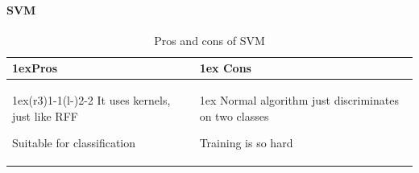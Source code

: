 \documentclass{article}
\begin{document}
        \paragraph{SVM}
        \begin{table}
        \begin{tabularx}{\linewidth}{>{\parskip1ex}X@{\kern4\tabcolsep}>{\parskip1ex}X}
        \toprule
        \hfil\bfseries Pros
        &
        \hfil\bfseries Cons
        \\\cmidrule(r{3\tabcolsep}){1-1}\cmidrule(l{-\tabcolsep}){2-2}
        It uses kernels, just like RFF\par
        Suitable for classification
        &
        Normal algorithm just discriminates on two classes\par
        Training is so hard
        \\\bottomrule
        \end{tabularx}
        \caption{Pros and cons of SVM}
        \end{table}
\end{document}
